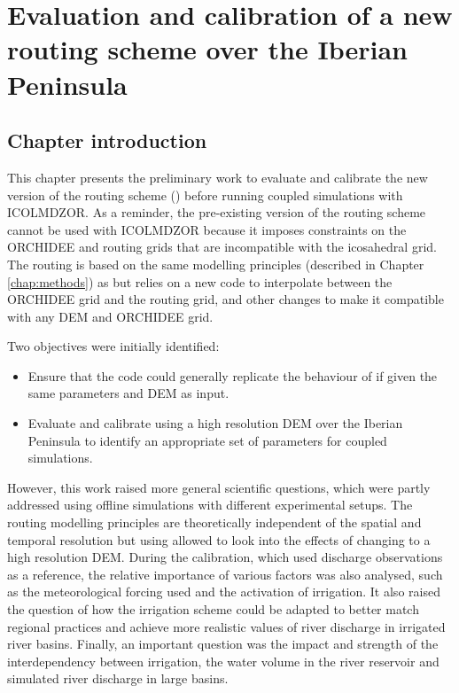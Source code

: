 \chapter{Evaluation and calibration of a new routing scheme over the Iberian Peninsula}
\label{chap:routing}
\minitoc
\pagebreak

\section{Chapter introduction}

This chapter presents the preliminary work to evaluate and calibrate the new version of the routing scheme (\native) before running coupled simulations with ICOLMDZOR. As a reminder, the pre-existing version of the routing scheme \std cannot be used with ICOLMDZOR because it imposes constraints on the ORCHIDEE and routing grids that are incompatible with the icosahedral grid. 
The \native routing is based on the same modelling principles (described in Chapter \ref{chap:methods}) as \std but relies on a new code to interpolate between the ORCHIDEE grid and the routing grid, and other changes to make it compatible with any DEM and ORCHIDEE grid.

Two objectives were initially identified:
\begin{itemize}
    \item Ensure that the \native code could generally replicate the behaviour of \std if given the same parameters and DEM as input. 
    \item Evaluate and calibrate \native using a high resolution DEM over the Iberian Peninsula to identify an appropriate set of parameters for coupled simulations.
\end{itemize}

However, this work raised more general scientific questions, which were partly addressed using offline simulations with different experimental setups. The routing modelling principles are theoretically independent of the spatial and temporal resolution but using \native allowed to look into the effects of changing to a high resolution DEM. During the calibration, which used discharge observations as a reference, the relative importance of various factors was also analysed, such as the meteorological forcing used and the activation of irrigation. It also raised the question of how the irrigation scheme could be adapted to better match regional practices and achieve more realistic values of river discharge in irrigated river basins. Finally, an important question was the impact and strength of the interdependency between irrigation, the water volume in the river reservoir and simulated river discharge in large basins.


